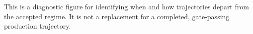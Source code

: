 This is a diagnostic figure for identifying when and how trajectories depart from the accepted regime. It is not a replacement for a completed, gate-passing production trajectory.
